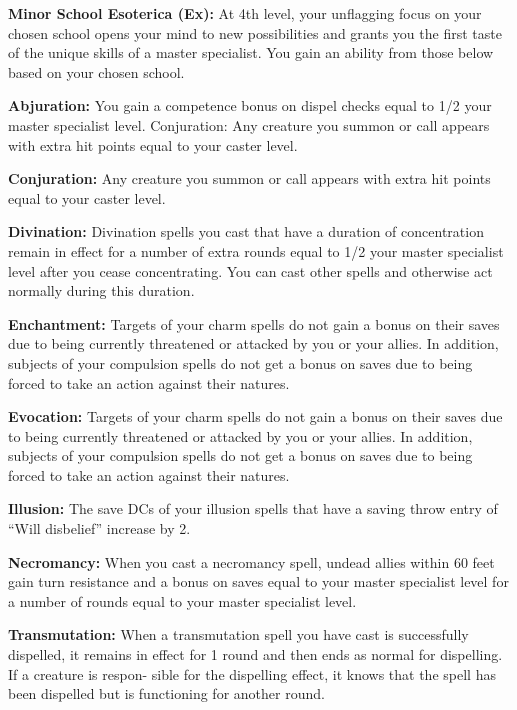 \textbf{Minor School Esoterica (Ex):} At 4th level, your unflagging focus on your chosen school opens your mind to new possibilities and grants you the first taste of the unique skills of a master specialist. You gain an ability from those below based on your chosen school.

\begin{itemize*}
\item \textbf{Abjuration:} You gain a competence bonus on dispel checks equal to 1/2 your master specialist level. Conjuration: Any creature you summon or call appears with extra hit points equal to your caster level.
\item \textbf{Conjuration:} Any creature you summon or call appears with extra hit points equal to your caster level.
\item \textbf{Divination:} Divination spells you cast that have a duration of concentration remain in effect for a number of extra rounds equal to 1/2 your master specialist level after you cease
concentrating. You can cast other spells and otherwise act normally during this duration.
\item \textbf{Enchantment:} Targets of your charm spells do not gain a bonus on their saves due to being currently threatened or attacked by you or your allies. In addition, subjects of your compulsion spells do not get a bonus on saves due to being forced to take an action against their natures.
\item \textbf{Evocation:} Targets of your charm spells do not gain a bonus on their saves due to being currently threatened or attacked by you or your allies. In addition, subjects of your compulsion spells do not get a bonus on saves due to being forced to take an action against their natures.
\item \textbf{Illusion:} The save DCs of your illusion spells that have a saving throw entry of “Will disbelief” increase by 2.
\item \textbf{Necromancy:} When you cast a necromancy spell, undead allies within 60 feet gain turn resistance and a bonus on saves equal to your master specialist level for a number of rounds equal to your master specialist level.
\item \textbf{Transmutation:} When a transmutation spell you have cast is successfully dispelled, it remains in effect for 1 round and then ends as normal for dispelling. If a creature is respon- sible for the dispelling effect, it knows that the spell has been dispelled but is functioning for another round.
\end{itemize*}

